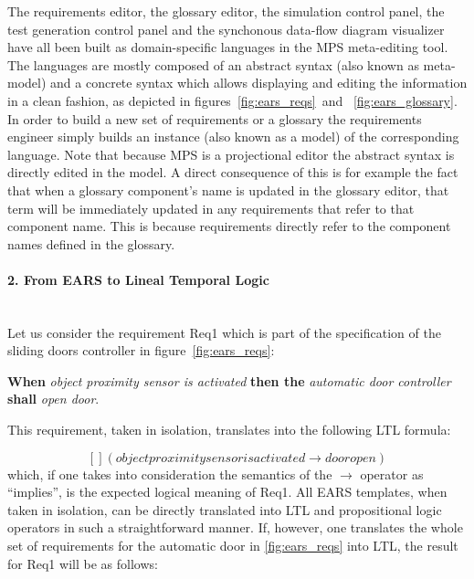 The requirements editor, the glossary editor, the simulation control panel, the
test generation control panel and the synchonous data-flow diagram visualizer
have all been built as domain-specific languages in the MPS meta-editing tool.
The languages are mostly composed of an abstract syntax (also known as
meta-model) and a concrete syntax which allows displaying and editing the
information in a clean fashion, as depicted in figures~\ref{fig:ears_reqs} and
~\ref{fig:ears_glossary}. In order to build a new set of
requirements or a glossary the requirements engineer simply builds an instance
(also known as a model) of the corresponding language. Note that because MPS is a
projectional editor the abstract syntax is directly edited in the model. A
direct consequence of this is for example the fact that when a glossary
component's name is updated in the glossary editor, that term will be
immediately updated in any requirements that refer to that component name. This
is because requirements directly refer to the component names defined in the
glossary.

\paragraph{2. From EARS to Lineal Temporal Logic\\\\}

Let us consider the requirement \textsf{Req1} which is part of the
specification of the sliding doors controller in figure~\ref{fig:ears_reqs}:

\begin{center}
\textbf{When} \emph{object proximity sensor is activated} \textbf{then the} \emph{automatic door controller} \textbf{shall}
\emph{open door}.
\end{center}

 This requirement, taken in isolation, translates into the following LTL
 formula:
 
$$[] (objectproximitysensorisactivated \rightarrow dooropen)$$
which, if one takes into consideration the semantics of the $\rightarrow$
operator as ``implies'', is the expected logical meaning of \textsf{Req1}. All EARS
templates, when taken in isolation, can be directly translated into LTL and
propositional logic operators in such a straightforward manner.
If, however, one translates the whole set of requirements for the automatic
door in \ref{fig:ears_reqs} into LTL, the result for \textsf{Req1} will be as follows:

